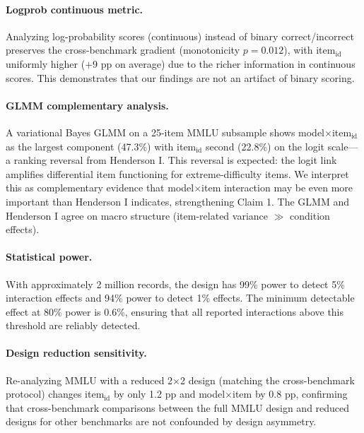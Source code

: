 \documentclass[letterpaper,11pt]{article}
\begin{document}
\paragraph{Logprob continuous metric.}
Analyzing log-probability scores (continuous) instead of binary correct/incorrect preserves the cross-benchmark gradient (monotonicity $p = 0.012$), with item$_{\text{id}}$ uniformly higher ($+$9 pp on average) due to the richer information in continuous scores.
This demonstrates that our findings are not an artifact of binary scoring.

\paragraph{GLMM complementary analysis.}
A variational Bayes GLMM on a 25-item MMLU subsample shows model$\times$item$_{\text{id}}$ as the largest component (47.3\%) with item$_{\text{id}}$ second (22.8\%) on the logit scale---a ranking reversal from Henderson I.
This reversal is expected: the logit link amplifies differential item functioning for extreme-difficulty items.
We interpret this as complementary evidence that model$\times$item interaction may be even more important than Henderson I indicates, strengthening Claim 1.
The GLMM and Henderson I agree on macro structure (item-related variance $\gg$ condition effects).

\paragraph{Statistical power.}
With approximately 2 million records, the design has 99\% power to detect 5\% interaction effects and 94\% power to detect 1\% effects.
The minimum detectable effect at 80\% power is 0.6\%, ensuring that all reported interactions above this threshold are reliably detected.

\paragraph{Design reduction sensitivity.}
Re-analyzing MMLU with a reduced 2$\times$2 design (matching the cross-benchmark protocol) changes item$_{\text{id}}$ by only 1.2 pp and model$\times$item by 0.8 pp, confirming that cross-benchmark comparisons between the full MMLU design and reduced designs for other benchmarks are not confounded by design asymmetry.

\end{document}
